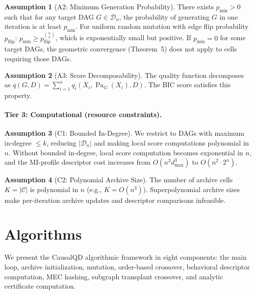 \documentclass{article}
\theoremstyle{definition}
\newtheorem{assumption}{Assumption}
\theoremstyle{plain}
\theoremstyle{remark}
\DeclareMathOperator{\Pa}{Pa}
\begin{document}
\begin{assumption}[A2: Minimum Generation Probability]
\label{ass:A2}
There exists $p_{\min} > 0$ such that for any target DAG $G \in \mathcal{D}_n$,
the probability of generating $G$ in one iteration is at least $p_{\min}$.
For uniform random mutation with edge flip probability $p_{\text{flip}}$:
$p_{\min} \geq p_{\text{flip}}^{\binom{n}{2}}$, which is exponentially small but
positive.
If $p_{\min} = 0$ for some target DAGs, the geometric convergence (Theorem~5) does not apply to cells requiring those DAGs.
\end{assumption}

\begin{assumption}[A3: Score Decomposability]
\label{ass:A3}
The quality function decomposes as
$q(G, D) = \sum_{i=1}^n q_i(X_i, \Pa_G(X_i), D)$.
The BIC score satisfies this property.
\end{assumption}

\paragraph{Tier 3: Computational (resource constraints).}

\begin{assumption}[C1: Bounded In-Degree]
\label{ass:C1}
We restrict to DAGs with maximum in-degree $\leq k$, reducing
$|\mathcal{D}_n|$ and making local score computations polynomial in $n$.
Without bounded in-degree, local score computation becomes exponential in $n$, and the MI-profile descriptor cost increases from $O(n^2 d_{\max}^3)$ to $O(n^2 \cdot 2^n)$.
\end{assumption}

\begin{assumption}[C2: Polynomial Archive Size]
\label{ass:C2}
The number of archive cells $K = |\mathcal{C}|$ is polynomial in $n$
(e.g., $K = O(n^3)$).
Superpolynomial archive sizes make per-iteration archive updates and descriptor comparisons infeasible.
\end{assumption}


\section{Algorithms}
\label{sec:algorithms}

We present the CausalQD algorithmic framework in eight components: the main loop,
archive initialization, mutation, order-based crossover, behavioral descriptor
computation, MEC hashing, subgraph transplant crossover, and analytic certificate
computation.
\end{document}
